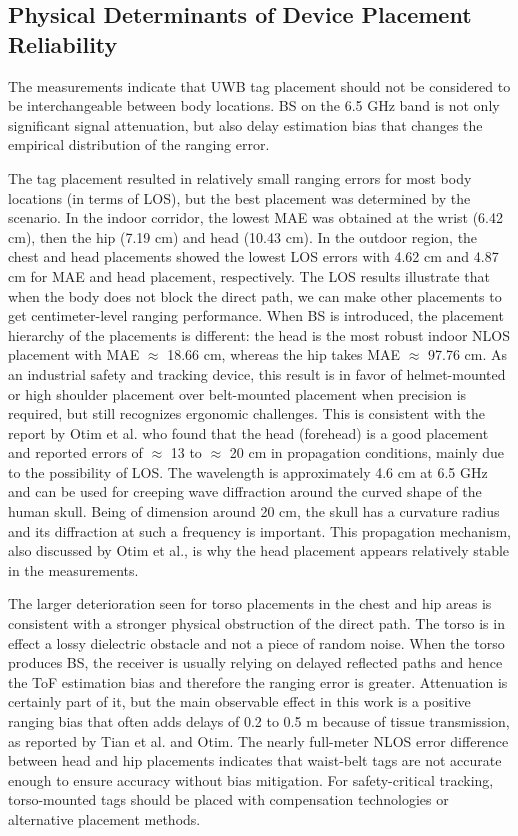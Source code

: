 \subsection{Physical Determinants of Device Placement Reliability}

The measurements indicate that UWB tag placement should not be considered to be interchangeable between body locations. BS on the 6.5 GHz band is not only significant signal attenuation, but also delay estimation bias that changes the empirical distribution of the ranging error.

The tag placement resulted in relatively small ranging errors for most body locations (in terms of LOS), but the best placement was determined by the scenario. In the indoor corridor, the lowest MAE was obtained at the wrist (6.42 cm), then the hip (7.19 cm) and head (10.43 cm). In the outdoor region, the chest and head placements showed the lowest LOS errors with 4.62 cm and 4.87 cm for MAE and head placement, respectively. The LOS results illustrate that when the body does not block the direct path, we can make other placements to get centimeter-level ranging performance. When BS is introduced, the placement hierarchy of the placements is different: the head is the most robust indoor NLOS placement with MAE $\approx$ 18.66 cm, whereas the hip takes MAE $\approx$ 97.76 cm. As an industrial safety and tracking device, this result is in favor of helmet-mounted or high shoulder placement over belt-mounted placement when precision is required, but still recognizes ergonomic challenges. This is consistent with the report by Otim et al. who found that the head (forehead) is a good placement and reported errors of $\approx$ 13 to $\approx$ 20 cm in propagation conditions, mainly due to the possibility of LOS. The wavelength is approximately 4.6 cm at 6.5 GHz and can be used for creeping wave diffraction around the curved shape of the human skull. Being of dimension around 20 cm, the skull has a curvature radius and its diffraction at such a frequency is important. This propagation mechanism, also discussed by Otim et al., is why the head placement appears relatively stable in the measurements.

The larger deterioration seen for torso placements in the chest and hip areas is consistent with a stronger physical obstruction of the direct path. The torso is in effect a lossy dielectric obstacle and not a piece of random noise. When the torso produces BS, the receiver is usually relying on delayed reflected paths and hence the ToF estimation bias and therefore the ranging error is greater. Attenuation is certainly part of it, but the main observable effect in this work is a positive ranging bias that often adds delays of 0.2 to 0.5 m because of tissue transmission, as reported by Tian et al. and Otim. The nearly full-meter NLOS error difference between head and hip placements indicates that waist-belt tags are not accurate enough to ensure accuracy without bias mitigation. For safety-critical tracking, torso-mounted tags should be placed with compensation technologies or alternative placement methods.

